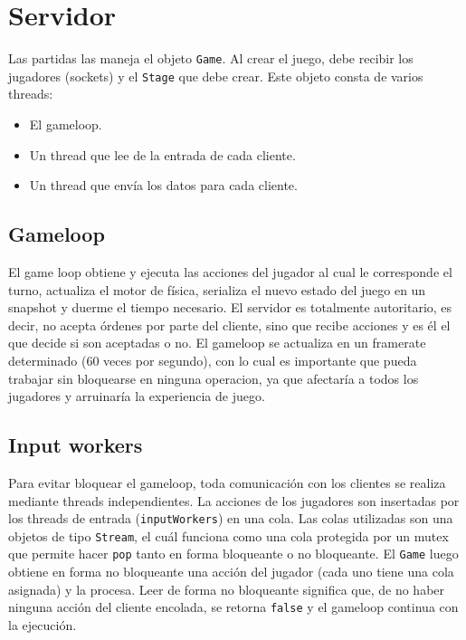 \section{Servidor}

Las partidas las maneja el objeto \texttt{Game}. Al crear el juego, debe recibir los jugadores (sockets) y el
\texttt{Stage} que debe crear. Este objeto consta de varios threads:

\begin{itemize}
    \item El gameloop.
    \item Un thread que lee de la entrada de cada cliente.
    \item Un thread que env\'ia los datos para cada cliente.
\end{itemize}


\subsection{Gameloop}

El game loop obtiene y ejecuta las acciones del jugador al cual le corresponde el turno, actualiza el motor de f\'isica,
serializa el nuevo estado del juego en un snapshot y duerme el tiempo necesario. El servidor es totalmente autoritario,
es decir, no acepta \'ordenes por parte del cliente, sino que recibe acciones y es \'el el que decide si son
aceptadas o no. El gameloop se actualiza en un framerate determinado (60 veces por segundo), con lo cual es importante
que pueda trabajar sin bloquearse en ninguna operacion, ya que afectar\'ia a todos los jugadores y arruinar\'ia la
experiencia de juego.


\subsection{Input workers}

Para evitar bloquear el gameloop, toda comunicaci\'on con los clientes se realiza mediante threads independientes. La acciones de los jugadores
son insertadas por los threads de entrada (\texttt{inputWorkers}) en una cola. Las colas utilizadas son
una objetos de tipo \texttt{Stream}, el cu\'al funciona como una cola protegida por un mutex que permite
hacer \texttt{pop} tanto en forma bloqueante o no bloqueante. El \texttt{Game} luego obtiene
en forma no bloqueante una acci\'on del jugador (cada uno tiene una cola asignada) y la procesa. Leer de forma
no bloqueante significa que, de no haber ninguna acci\'on del cliente encolada, se retorna \texttt{false} y
el gameloop continua con la ejecuci\'on.


